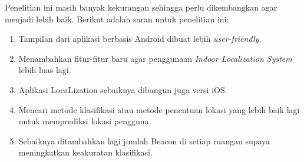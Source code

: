 Penelitian ini masih banyak kekurangan sehingga perlu dikembangkan agar menjadi lebih baik. Berikut adalah saran untuk penelitian ini:
\begin{enumerate}
	\item Tampilan dari aplikasi berbasis Android dibuat lebih \textit{user-friendly}.
	\item Menambahkan fitur-fitur baru agar penggunaan \textit{Indoor Localization System} lebih luas lagi.
	\item Aplikasi LocaLization sebaiknya dibangun juga  versi iOS.
	\item Mencari metode klasifikasi atau metode penentuan lokasi yang lebih baik lagi untuk memprediksi lokasi pengguna.
	\item Sebaiknya ditambahkan lagi jumlah Beacon di setiap ruangan supaya meningkatkan keakuratan klasifikasi.

\end{enumerate}

\fancyhf{}
\fancyfoot[R]{\thepage}

\begin{comment}

\end{comment}
